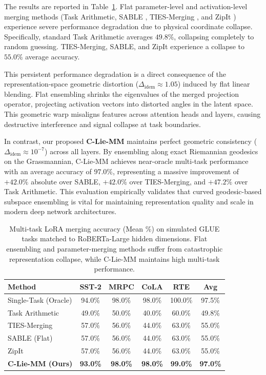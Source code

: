 The results are reported in Table~\ref{tab:lora_results}. Flat parameter-level and activation-level merging methods (Task Arithmetic, SABLE \cite{dauner23}, TIES-Merging \cite{yadav23}, and ZipIt \cite{stoica23}) experience severe performance degradation due to physical coordinate collapse. Specifically, standard Task Arithmetic averages $49.8\%$, collapsing completely to random guessing. TIES-Merging, SABLE, and ZipIt experience a collapse to $55.0\%$ average accuracy.

This persistent performance degradation is a direct consequence of the representation-space geometric distortion ($\Delta_{\text{idem}} \approx 1.05$) induced by flat linear blending. Flat ensembling shrinks the eigenvalues of the merged projection operator, projecting activation vectors into distorted angles in the latent space. This geometric warp misaligns features across attention heads and layers, causing destructive interference and signal collapse at task boundaries.

In contrast, our proposed \textbf{C-Lie-MM} maintains perfect geometric consistency ($\Delta_{\text{idem}} \approx 10^{-7}$) across all layers. By ensembling along exact Riemannian geodesics on the Grassmannian, C-Lie-MM achieves near-oracle multi-task performance with an average accuracy of \textbf{$97.0\%$}, representing a massive improvement of \textbf{$+42.0\%$} absolute over SABLE, \textbf{$+42.0\%$} over TIES-Merging, and \textbf{$+47.2\%$} over Task Arithmetic. This evaluation empirically validates that curved geodesic-based subspace ensembling is vital for maintaining representation quality and scale in modern deep network architectures.

\begin{table}[h]
\centering
\caption{Multi-task LoRA merging accuracy (Mean \%) on simulated GLUE tasks matched to RoBERTa-Large hidden dimensions. Flat ensembling and parameter-merging methods suffer from catastrophic representation collapse, while C-Lie-MM maintains high multi-task performance.}
\label{tab:lora_results}
\vskip 0.1in
\begin{small}
\begin{sc}
\begin{tabular}{lccccc}
\toprule
Method & SST-2 & MRPC & CoLA & RTE & Avg \\
\midrule
Single-Task (Oracle) & 94.0\% & 98.0\% & 98.0\% & 100.0\% & 97.5\% \\
\midrule
Task Arithmetic     & 49.0\% & 50.0\% & 40.0\% & 60.0\% & 49.8\% \\
TIES-Merging        & 57.0\% & 56.0\% & 44.0\% & 63.0\% & 55.0\% \\
SABLE (Flat)        & 57.0\% & 56.0\% & 44.0\% & 63.0\% & 55.0\% \\
ZipIt               & 57.0\% & 56.0\% & 44.0\% & 63.0\% & 55.0\% \\
\midrule
\textbf{C-Lie-MM (Ours)} & \textbf{93.0\%} & \textbf{98.0\%} & \textbf{98.0\%} & \textbf{99.0\%} & \textbf{97.0\%} \\
\bottomrule
\end{tabular}
\end{sc}
\end{small}
\end{table}

